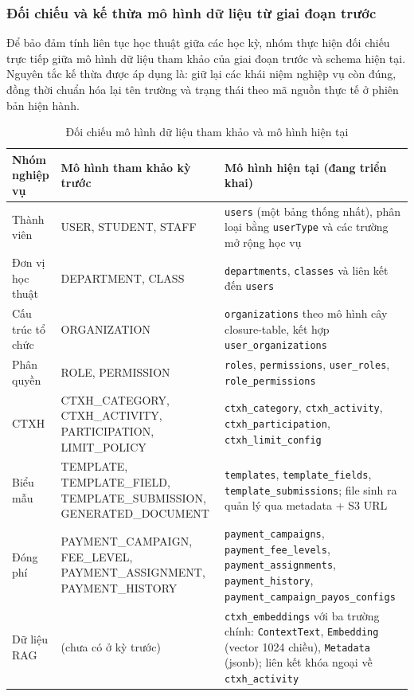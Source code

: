 \subsubsection{Đối chiếu và kế thừa mô hình dữ liệu từ giai đoạn trước}
Để bảo đảm tính liên tục học thuật giữa các học kỳ, nhóm thực hiện đối chiếu trực tiếp giữa mô hình dữ liệu tham khảo của giai đoạn trước và schema hiện tại. Nguyên tắc kế thừa được áp dụng là: giữ lại các khái niệm nghiệp vụ còn đúng, đồng thời chuẩn hóa lại tên trường và trạng thái theo mã nguồn thực tế ở phiên bản hiện hành.

\begin{table}[H]
\centering
\renewcommand{\arraystretch}{1.2}
\small
\begin{tabularx}{\textwidth}{|>{\raggedright\arraybackslash}p{3.4cm}|>{\raggedright\arraybackslash}p{4.8cm}|>{\raggedright\arraybackslash}X|}
\hline
\textbf{Nhóm nghiệp vụ} & \textbf{Mô hình tham khảo kỳ trước} & \textbf{Mô hình hiện tại (đang triển khai)} \\
\hline
Thành viên & USER, STUDENT, STAFF & \texttt{users} (một bảng thống nhất), phân loại bằng \texttt{userType} và các trường mở rộng học vụ \\
\hline
Đơn vị học thuật & DEPARTMENT, CLASS & \texttt{departments}, \texttt{classes} và liên kết đến \texttt{users} \\
\hline
Cấu trúc tổ chức & ORGANIZATION & \texttt{organizations} theo mô hình cây closure-table, kết hợp \texttt{user\_organizations} \\
\hline
Phân quyền & ROLE, PERMISSION & \texttt{roles}, \texttt{permissions}, \texttt{user\_roles}, \texttt{role\_permissions} \\
\hline
CTXH & CTXH\_CATEGORY, CTXH\_ACTIVITY, PARTICIPATION, LIMIT\_POLICY & \texttt{ctxh\_category}, \texttt{ctxh\_activity}, \texttt{ctxh\_participation}, \texttt{ctxh\_limit\_config} \\
\hline
Biểu mẫu & TEMPLATE, TEMPLATE\_FIELD, TEMPLATE\_SUBMISSION, GENERATED\_DOCUMENT & \texttt{templates}, \texttt{template\_fields}, \texttt{template\_submissions}; file sinh ra quản lý qua metadata + S3 URL \\
\hline
Đóng phí & PAYMENT\_CAMPAIGN, FEE\_LEVEL, PAYMENT\_ASSIGNMENT, PAYMENT\_HISTORY & \texttt{payment\_campaigns}, \texttt{payment\_fee\_levels}, \texttt{payment\_assignments}, \texttt{payment\_history}, \texttt{payment\_campaign\_payos\_configs} \\
\hline
Dữ liệu RAG & (chưa có ở kỳ trước) & \texttt{ctxh\_embeddings} với ba trường chính: \texttt{ContextText}, \texttt{Embedding} (vector 1024 chiều), \texttt{Metadata} (jsonb); liên kết khóa ngoại về \texttt{ctxh\_activity} \\
\hline
\end{tabularx}
\caption{Đối chiếu mô hình dữ liệu tham khảo và mô hình hiện tại}
\end{table}

